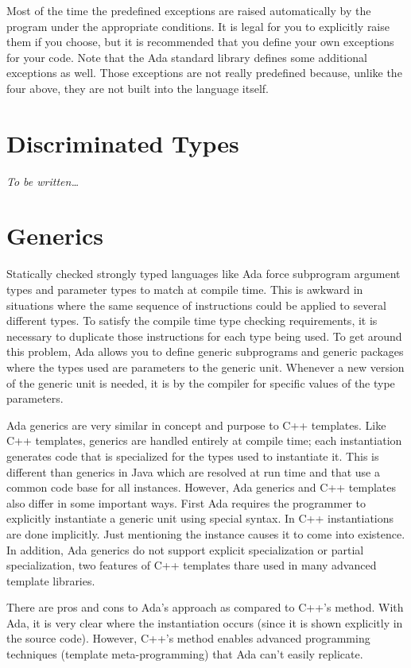 Most of the time the predefined exceptions are raised automatically by the program under the
appropriate conditions. It is legal for you to explicitly raise them if you choose, but it is
recommended that you define your own exceptions for your code. Note that the Ada standard
library defines some additional exceptions as well. Those exceptions are not really predefined
because, unlike the four above, they are not built into the language itself.

\section{Discriminated Types}

\emph{To be written\ldots}

\section{Generics}

Statically checked strongly typed languages like Ada force subprogram argument types and
parameter types to match at compile time. This is awkward in situations where the same sequence
of instructions could be applied to several different types. To satisfy the compile time type
checking requirements, it is necessary to duplicate those instructions for each type being used.
To get around this problem, Ada allows you to define generic subprograms and generic packages
where the types used are parameters to the generic unit. Whenever a new version of the generic
unit is needed, it is  by the compiler for specific values of the type
parameters.

Ada generics are very similar in concept and purpose to C++ templates. Like C++ templates,
generics are handled entirely at compile time; each instantiation generates code that is
specialized for the types used to instantiate it. This is different than generics in Java which
are resolved at run time and that use a common code base for all instances. However, Ada
generics and C++ templates also differ in some important ways. First Ada requires the programmer
to explicitly instantiate a generic unit using special syntax. In C++ instantiations are done
implicitly. Just mentioning the instance causes it to come into existence. In addition, Ada
generics do not support explicit specialization or partial specialization, two features of C++
templates thare used in many advanced template libraries.

There are pros and cons to Ada's approach as compared to C++'s method. With Ada, it is very
clear where the instantiation occurs (since it is shown explicitly in the source code). However,
C++'s method enables advanced programming techniques (template meta-programming) that Ada can't
easily replicate.


